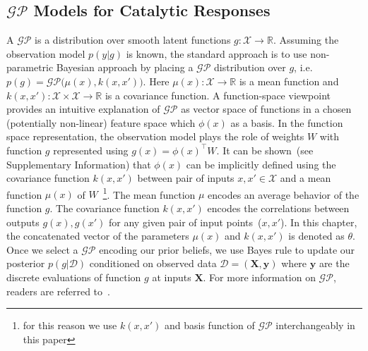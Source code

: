 \subsection{\(\mathcal{GP}\) Models for Catalytic Responses}
A \(\mathcal{GP}\) is a distribution over smooth latent functions \(g: \mathcal{X} \rightarrow \mathbb{R}\). 
Assuming the observation model \(p(y\vert g)\) is known, the standard approach is to use non-parametric Bayesian approach by placing a \(\mathcal{GP}\) distribution over \(g\), i.e. \(p(g)=\mathcal{GP}\big(\mu(x),k(x,x')\big)\). 
Here \(\mu(x):\mathcal{X}\rightarrow \mathbb{R}\) is a mean function and \(k(x,x'):\mathcal{X}\times\mathcal{X}\rightarrow \mathbb{R}\) is a covariance function. 
A function-space viewpoint provides an intuitive explanation of \(\mathcal{GP}\) as vector space of functions in a chosen (potentially non-linear) feature space which \(\phi(x)\) as a basis. 
In the function space representation, the observation model plays the role of weights \(W\) with function \(g\) represented using \(g(x) = \phi(x)^{\top}W\). 
It can be shown~(see Supplementary Information) that \(\phi(x)\) can be implicitly defined using the covariance function \(k(x,x')\) between pair of inputs \(x,x'\in\mathcal{X}\) and a mean function \(\mu(x)\) of \(W\)~\footnote{for this reason we use \(k(x,x')\) and basis function of \(\mathcal{GP}\) interchangeably in this paper}. 
The mean function \(\mu\) encodes an average behavior of the function \(g\). 
The covariance function \(k(x,x')\) encodes the correlations between outputs \(g(x), g(x')\) for any given pair of input points~(\(x,x'\)). 
In this chapter, the concatenated vector of the parameters \(\mu(x)\) and \(k(x,x')\) is denoted as \(\theta\).
Once we select a \(\mathcal{GP}\) encoding our prior beliefs, we use Bayes rule to update our posterior \(p(g\vert \mathcal{D})\) conditioned on observed data \(\mathcal{D}=(\textbf{X},\textbf{y})\) where \(\textbf{y}\) are the discrete evaluations of function \(g\) at inputs \(\textbf{X}\). 
For more information on \(\mathcal{GP}\), readers are referred to~\cite{williams2006gaussian}.


